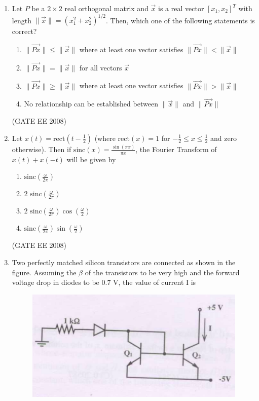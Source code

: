 \documentclass[journal,12pt,onecolumn]{IEEEtran}
\theoremstyle{remark}
\begin{document}
\begin{enumerate}[start=1, label=Q.\arabic*]
\item Let $P$ be a $2\times 2$ real orthogonal matrix and $\vec{x}$ is a real vector $[x_1, x_2]^T$ with length $\|\vec{x}\| = (x_1^2+x_2^2)^{1/2}$. Then, which one of the following statements is correct?

\begin{enumerate}[label=(\Alph*)]
    \item $\|\vec{Px}\| \le \|\vec{x}\|$ where at least one vector satisfies $\|\vec{Px}\| < \|\vec{x}\|$
    \item $\|\vec{Px}\| = \|\vec{x}\|$ for all vectors $\vec{x}$
    \item $\|\vec{Px}\| \ge \|\vec{x}\|$ where at least one vector satisfies $\|\vec{Px}\| > \|\vec{x}\|$
    \item No relationship can be established between $\|\vec{x}\|$ and $\|\vec{Px}\|$
\end{enumerate}
\hfill (GATE EE 2008)


\item Let $x(t) = \text{rect}\left(t-\frac{1}{2}\right)$ (where $\text{rect}(x)=1$ for $-\frac{1}{2} \le x \le \frac{1}{2}$ and zero otherwise). Then if $\text{sinc}(x)=\frac{\sin(\pi x)}{\pi x}$, the Fourier Transform of $x(t)+x(-t)$ will be given by

\begin{multicols}{2}
\begin{enumerate}[label=(\Alph*)]
    \item $\text{sinc}\left(\frac{\omega}{2\pi}\right)$
    \item $2 \text{ sinc}\left(\frac{\omega}{2\pi}\right)$
    \item $2 \text{ sinc}\left(\frac{\omega}{2\pi}\right)\cos\left(\frac{\omega}{2}\right)$
    \item $\text{sinc}\left(\frac{\omega}{2\pi}\right)\sin\left(\frac{\omega}{2}\right)$
\end{enumerate}
\end{multicols}
\hfill (GATE EE 2008)

\item Two perfectly matched silicon transistors are connected as shown in the figure. Assuming the $\beta$ of the transistors to be very high and the forward voltage drop in diodes to be $0.7$ V, the value of current I is

\begin{figure}[H]
    \centering
    \includegraphics[width=\columnwidth]{Fig/q40.png}
\end{figure}


\end{enumerate}
\end{document}
